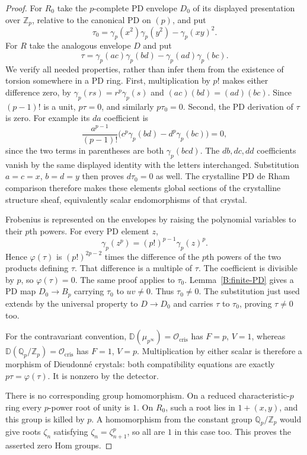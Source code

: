 \begin{proof}
For $R_0$ take the $p$-complete PD envelope $D_0$ of its displayed
presentation over $\mathbb Z_p$, relative to the canonical PD on
$(p)$, and put
\[
 \tau_0=\gamma_p(x^2)\gamma_p(y^2)-\gamma_p(xy)^2.
\]
For $R$ take the analogous envelope $D$ and put
\[
 \tau=\gamma_p(ac)\gamma_p(bd)-\gamma_p(ad)\gamma_p(bc).
\]
We verify all needed properties, rather than infer them from the
existence of torsion somewhere in a PD ring. First, multiplication
by $p!$ makes either difference zero, by
$\gamma_p(rs)=r^p\gamma_p(s)$ and
$(ac)(bd)=(ad)(bc)$. Since $(p-1)!$ is a unit, $p\tau=0$,
and similarly $p\tau_0=0$.
Second, the PD derivation of $\tau$ is zero. For example its
$da$ coefficient is
\[
 \frac{a^{p-1}}{(p-1)!}
 \bigl(c^p\gamma_p(bd)-d^p\gamma_p(bc)\bigr)=0,
\]
since the two terms in parentheses are both $\gamma_p(bcd)$.
The $db,dc,dd$ coefficients vanish by the same displayed identity
with the letters interchanged. Substitution $a=c=x$, $b=d=y$
then proves $d\tau_0=0$ as well.
The crystalline PD de Rham comparison
\cite[Proposition 60.21.3 and Example 60.22.1]{B:StacksCounterexamples}
therefore makes these elements global sections of the crystalline
structure sheaf, equivalently scalar endomorphisms of that crystal.

Frobenius is represented on the envelopes by raising the polynomial
variables to their $p$th powers. For every PD element $z$,
\[
 \gamma_p(z^p)=(p!)^{p-1}\gamma_p(z)^p.
\]
Hence $\varphi(\tau)$ is
$(p!)^{2p-2}$ times the difference of the $p$th powers of the two
products defining $\tau$. That difference is a multiple of $\tau$.
The coefficient is divisible by $p$, so $\varphi(\tau)=0$.
The same proof applies to $\tau_0$.
Lemma~\ref{B:finite-PD} gives a PD map $D_0\to B_p$ carrying
$\tau_0$ to $uv\ne0$. Thus $\tau_0\ne0$. The substitution just
used extends by the universal property to $D\to D_0$ and carries
$\tau$ to $\tau_0$, proving $\tau\ne0$ too.

For the contravariant convention,
$\mathbb D(\mu_{p^\infty})=\mathcal O_{\mathrm{cris}}$ has
$F=p$, $V=1$, whereas
$\mathbb D(\mathbb Q_p/\mathbb Z_p)=\mathcal O_{\mathrm{cris}}$
has $F=1$, $V=p$. Multiplication by either scalar is therefore a
morphism of Dieudonn\'e crystals: both compatibility equations
are exactly $p\tau=\varphi(\tau)$. It is nonzero by the detector.

There is no corresponding group homomorphism. On a reduced
characteristic-$p$ ring every $p$-power root of unity is $1$.
On $R_0$, such a root lies in $1+(x,y)$, and this group is killed
by $p$. A homomorphism from the constant group
$\mathbb Q_p/\mathbb Z_p$ would give roots $\zeta_n$ satisfying
$\zeta_n=\zeta_{n+1}^p$, so all are $1$ in this case too.
This proves the asserted zero Hom groups.


\end{proof}
